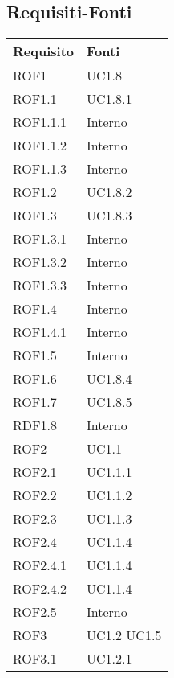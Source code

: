 \subsection{Requisiti-Fonti} %
\label{ssub:requisiti_fonti}

\begin{center}

\def\arraystretch{1.5}
\bgroup
\begin{longtable}{| p{4cm} | p{4cm} |}

	\hline
	\textbf{Requisito} & \textbf{Fonti} \\
	\hline


	ROF1  & UC1.8 \\
	\hline
	ROF1.1  &  UC1.8.1 \\
	\hline
	ROF1.1.1  &  Interno \\
	\hline
	ROF1.1.2  &  Interno \\
	\hline
	ROF1.1.3  &  Interno \\
	\hline
	ROF1.2  &  UC1.8.2 \\
	\hline
	ROF1.3  &  UC1.8.3 \\
	\hline
	ROF1.3.1  &  Interno \\
	\hline
	ROF1.3.2  &  Interno \\
	\hline
	ROF1.3.3  &  Interno \\
	\hline
	ROF1.4  &  Interno \\
	\hline
	ROF1.4.1  &  Interno \\
	\hline
	ROF1.5  &  Interno \\
	\hline
	ROF1.6  &  UC1.8.4 \\
	\hline
	ROF1.7  &  UC1.8.5 \\
	\hline
	RDF1.8  &  Interno \\
	\hline
	ROF2  &  UC1.1 \\
	\hline
	ROF2.1  &  UC1.1.1 \\
	\hline
	ROF2.2  &  UC1.1.2 \\
	\hline
	ROF2.3  &  UC1.1.3 \\
	\hline
	ROF2.4  &  UC1.1.4 \\
	\hline
	ROF2.4.1  &  UC1.1.4 \\
	\hline
	ROF2.4.2  &  UC1.1.4 \\
	\hline
	ROF2.5  &  Interno  \\
	\hline
	ROF3  &  UC1.2 \newline UC1.5 \\
	\hline
	ROF3.1  &  UC1.2.1 \\

\end{longtable}
\end{center}
